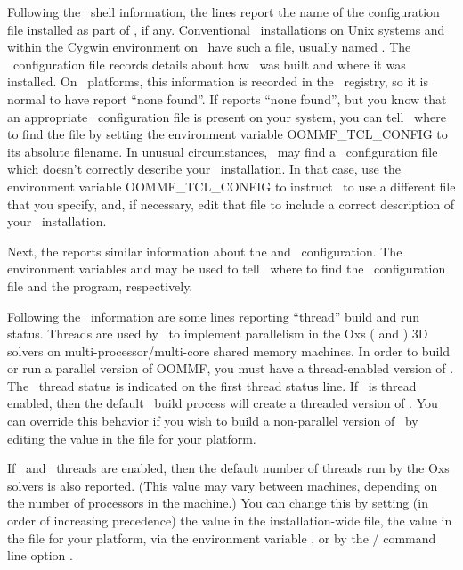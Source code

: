 Following the \Tcl\ shell information, the  lines
report the name of the configuration file installed as part of \Tcl, if
any.  Conventional \Tcl\ installations on Unix systems and within the
Cygwin environment on
\Windows\ have such a file, usually named .  The
\Tcl\ configuration file records details about how \Tcl\ was built and
where it was installed.  On \Windows\ platforms, this information is
recorded in the
\Windows\ registry, so
it is normal to have  report ``none found''.  If
 reports ``none found'', but you know that an
appropriate \Tcl\ configuration file is present on your system, you can
tell \OOMMF\ where to find the file by setting the environment variable
OOMMF\_TCL\_CONFIG to
its absolute filename.  In unusual circumstances, \OOMMF\ may find a
\Tcl\ configuration file which doesn't correctly describe your
\Tcl\ installation.  In that case, use the environment variable
OOMMF\_TCL\_CONFIG to instruct \OOMMF\ to use a different file that you
specify, and, if necessary, edit that file to include a correct
description of your \Tcl\ installation.

Next, the  reports similar information about the
 and \Tk\ configuration.  The environment variables
and  may be
used to tell \OOMMF\ where to find the \Tk\ configuration file and the
 program, respectively.

Following the \Tk\ information are some lines reporting ``thread'' build
and run status. Threads are used by \OOMMF\ to implement parallelism in
the Oxs ( and ) 3D solvers on
multi-processor/multi-core shared memory machines.  In order to build or
run a parallel version of OOMMF, you must have a thread-enabled version
of \Tcl.  The \Tcl\ thread status is indicated on the first thread
status line.  If \Tcl\ is thread enabled, then the default \OOMMF\ build
process will create a threaded version of \OOMMF.  You can override this
behavior if you wish to build a non-parallel version of \OOMMF\ by
editing the
 value in
the  file for your platform.

If \Tcl\ and \OOMMF\ threads are enabled, then the default number of
threads run by the Oxs solvers is also reported.  (This value may vary
between machines, depending on the number of processors in the
machine.)  You can change this by setting (in order of increasing
precedence) the
value in the installation-wide  file, the
 value in
the  file for your platform, via the environment
variable
, or by
the / command line option .

